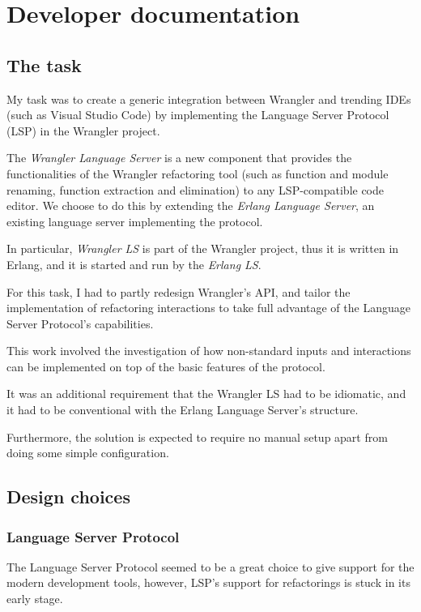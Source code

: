 \chapter{Developer documentation}
\label{ch:impl}

\section{The task}

My task was to create a generic integration between Wrangler and trending IDEs (such as Visual Studio Code) by implementing the Language Server Protocol (LSP) in the Wrangler project.

The \emph{Wrangler Language Server} is a new component that provides the functionalities of the Wrangler refactoring tool (such as function and module renaming, function extraction and elimination) to any LSP-compatible code editor. We choose to do this by extending the \emph{Erlang Language Server}, an existing language server implementing the protocol.

In particular, \emph{Wrangler LS} is part of the Wrangler project, thus it is written in Erlang, and it is started and run by the \emph{Erlang LS}.

For this task, I had to partly redesign Wrangler’s API, and tailor the implementation of refactoring interactions to take full advantage of the Language Server Protocol’s capabilities. 

This work involved the investigation of how non-standard inputs and interactions can be implemented on top of the basic features of the protocol.

It was an additional requirement that the Wrangler LS had to be idiomatic, and it had to be conventional with the Erlang Language Server's structure. 

Furthermore, the solution is expected to require no manual setup apart from doing some simple configuration.

\section{Design choices}

\subsection{Language Server Protocol}

The Language Server Protocol seemed to be a great choice to give support for the modern development tools, however, LSP's support for refactorings is stuck in its early stage.

